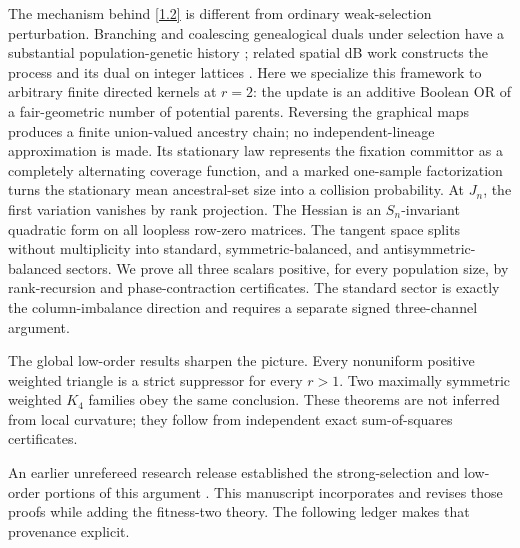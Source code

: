 The mechanism behind \eqref{1.2} is different from ordinary weak-selection
perturbation.  Branching and coalescing genealogical duals under selection
have a substantial population-genetic history
\citep{KroneNeuhauser1997,EtheridgeGriffiths2009,Mano2009}; related spatial
dB work constructs the process and its dual on integer lattices
\citep{Foo2024}.  Here we specialize this framework to arbitrary finite
directed kernels at $r=2$: the update is an additive Boolean OR of a
fair-geometric number of potential parents.
Reversing the graphical maps produces a finite union-valued ancestry chain;
no independent-lineage approximation is made.  Its stationary law represents
the fixation committor as a completely alternating coverage function, and a
marked one-sample factorization turns the stationary mean ancestral-set size
into a collision probability.  At $J_n$,
the first variation vanishes by rank projection.  The Hessian is an
$S_n$-invariant quadratic form on all loopless row-zero matrices.  The
tangent space splits without multiplicity into standard,
symmetric-balanced, and antisymmetric-balanced sectors.  We prove all three
scalars positive, for every population size, by rank-recursion and
phase-contraction certificates.  The
standard sector is exactly the column-imbalance direction and requires a
separate signed three-channel argument.

The global low-order results sharpen the picture.  Every nonuniform positive
weighted triangle is a strict suppressor for every $r>1$.  Two maximally
symmetric weighted $K_4$ families obey the same conclusion.  These theorems
are not inferred from local curvature; they follow from independent exact
sum-of-squares certificates.

An earlier unrefereed research release established the strong-selection and
low-order portions of this argument \citep{Kriebel2026Archive}.  This
manuscript incorporates and revises those proofs while adding the fitness-two
theory.  The following ledger makes that provenance explicit.

